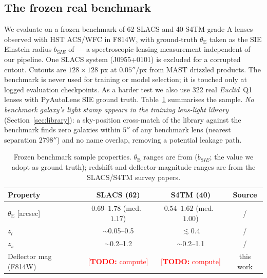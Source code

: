 \documentclass[fleqn,usenatbib]{mnras}
\newcommand{\thetaE}{\theta_{\mathrm{E}}}
\newcommand{\bsie}{b_{\mathrm SIE}}
\newcommand{\todo}[1]{\textcolor{red}{[\textbf{TODO:} #1]}}
\begin{document}
\subsection{The frozen real benchmark}
\label{sec:benchmark}
We evaluate on a frozen benchmark of 62 SLACS and 40 S4TM grade-A lenses
observed with HST ACS/WFC in F814W, with ground-truth $\thetaE$ taken as the
SIE Einstein radius $\bsie$ of \citet{Bolton2008} --- a spectroscopic-lensing
measurement independent of our pipeline. One SLACS system (J0955+0101) is
excluded for a corrupted cutout. Cutouts are $128\times128$ px at
$0.05''$/px from MAST drizzled products. The benchmark is never used for
training or model selection; it is touched only at logged evaluation
checkpoints. As a harder test we also use 322 real \textit{Euclid}~Q1 lenses
with PyAutoLens SIE ground truth. Table~\ref{tab:benchmark} summarises the
sample. \emph{No benchmark galaxy's light stamp appears in the training
lens-light library} (Section~\ref{sec:library}): a sky-position cross-match of
the library against the benchmark finds zero galaxies within $5''$ of any
benchmark lens (nearest separation $2798''$) and no name overlap, removing a
potential leakage path.

\begin{table}
\centering
\caption{Frozen benchmark sample properties. $\thetaE$ ranges are from
\citet{Bolton2008} ($\bsie$; the value we adopt as ground truth); redshift and
deflector-magnitude ranges are from the SLACS/S4TM survey papers.}
\label{tab:benchmark}
\begin{tabular}{lccc}
\toprule
Property & SLACS (62) & S4TM (40) & Source \\
\midrule
$\thetaE$ [arcsec] & $0.69$--$1.78$ (med.\ $1.17$) & $0.54$--$1.62$ (med.\ $1.00$) & \citet{Bolton2008}/\citet{Shu2017} \\
$z_l$              & $\sim$0.05--0.5 & $\lesssim$0.4 & \citet{Auger2010}/\citet{Shu2017} \\
$z_s$              & $\sim$0.2--1.2  & $\sim$0.2--1.1 & \citet{Bolton2008}/\citet{Shu2017} \\
Deflector mag (F814W) & \todo{compute} & \todo{compute} & this work \\
\bottomrule
\end{tabular}
\end{table}
\end{document}
